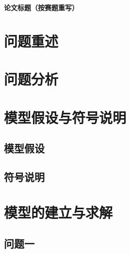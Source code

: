 \documentclass[12pt,a4paper,fontset=fandol]{ctexart}
\begin{document}
\begin{center}
  {\LARGE\bfseries 论文标题（按赛题重写）}
\end{center}

\begin{abstract}
  （中文摘要正文：每个子问题独立成段，先写结论后写方法；
  摘要中每个数字必须在正文中原样出现。）
  \vspace{2mm}

  \noindent\textbf{关键词：}关键词一；关键词二；关键词三
\end{abstract}


\clearpage

\section{问题重述}


\section{问题分析}


\section{模型假设与符号说明}
\subsection{模型假设}


\subsection{符号说明}


\section{模型的建立与求解}
\subsection{问题一}

\end{document}
